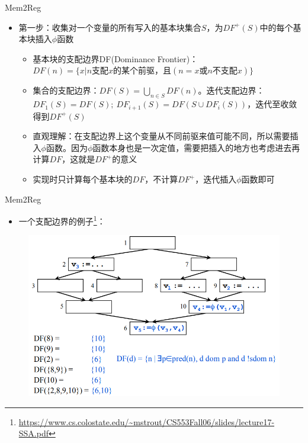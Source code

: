 \documentclass{beamer}
\begin{document}
\begin{frame}{Mem2Reg}
\begin{itemize}
  \item 第一步：收集对一个变量的所有写入的基本块集合$S$，为$DF^+(S)$中的每个基本块插入$\phi$函数
  \begin{itemize}
    \item 基本块的支配边界DF(Dominance Frontier)：$DF(n) = \{ x | n\text{支配}x\text{的某个前驱，且}(n = x\text{或}n\text{不支配}x) \}$
    \item 集合的支配边界：$DF(S) = \bigcup_{n \in S} DF(n)$。迭代支配边界：$DF_1(S) = DF(S);\ DF_{i + 1}(S) = DF(S \cup DF_i(S))$，迭代至收敛得到$DF^+(S)$
    \item 直观理解：在支配边界上这个变量从不同前驱来值可能不同，所以需要插入$\phi$函数。因为$\phi$函数本身也是一次定值，需要把插入的地方也考虑进去再计算$DF$，这就是$DF^+$的意义
    \item 实现时只计算每个基本块的$DF$，不计算$DF^+$，迭代插入$\phi$函数即可
  \end{itemize}
\end{itemize}
\end{frame}



\begin{frame}{Mem2Reg}
\begin{itemize}
  \item 一个支配边界的例子\footnote[1]{\href{https://www.cs.colostate.edu/~mstrout/CS553Fall06/slides/lecture17-SSA.pdf}{https://www.cs.colostate.edu/\textasciitilde mstrout/CS553Fall06/slides/lecture17-SSA.pdf}}：
\end{itemize}
\begin{figure}[htpb]
  \centering
  \includegraphics[width=0.8\linewidth]{pic/df.png}
\end{figure}
\end{frame}
\end{document}
